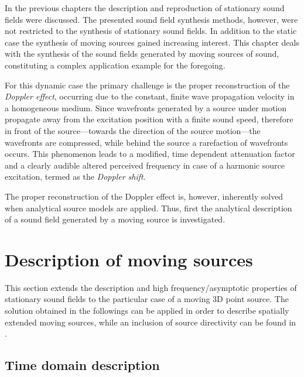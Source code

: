 In the previous chapters the description and reproduction of stationary sound fields were discussed.
The presented sound field synthesis methods, however, were not restricted to the synthesis of stationary sound fields.
In addition to the static case the synthesis of moving sources gained increasing interest.
This chapter deals with the synthesis of the sound fields generated by moving sources of sound, constituting a complex application example for the foregoing.

For this dynamic case the primary challenge is the proper reconstruction of the \emph{Doppler effect}, occurring due to the constant, finite wave propagation velocity in a homogeneous medium.
Since wavefronts generated by a source under motion propagate away from the excitation position with a finite sound speed, therefore in front of the source---towards the direction of the source motion---the wavefronts are compressed, while behind the source a rarefaction of wavefronts occurs.
This phenomenon leads to a modified, time dependent attenuation factor and a clearly audible altered perceived frequency in case of a harmonic source excitation, termed as the \emph{Doppler shift}.

The proper reconstruction of the Doppler effect is, however, inherently solved when analytical source models are applied.
Thus, first the analytical description of a sound field generated by a moving source is investigated.

\section{Description of moving sources}

This section extends the description and high frequency/asymptotic properties of stationary sound fields to the particular case of a moving 3D point source.
The solution obtained in the followings can be applied in order to describe spatially extended moving sources, while an inclusion of source directivity can be found in \cite{Warren1976, Ahrens2011_moving_source_WFS}.

\subsection{Time domain description}
	
